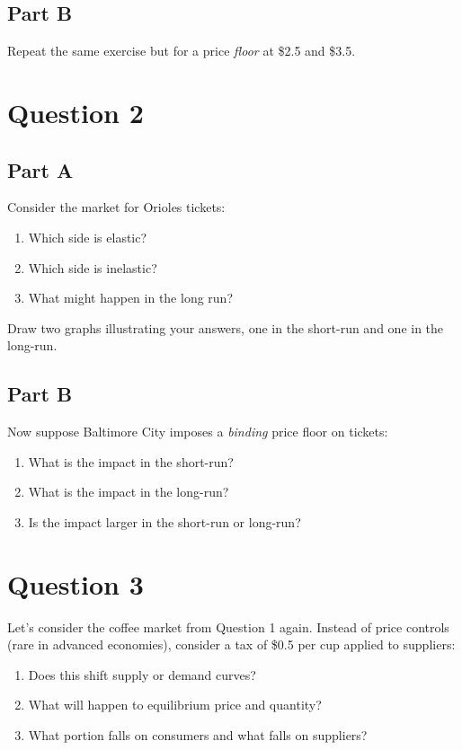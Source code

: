 \documentclass[12pt]{article}
\begin{document}
\subsection*{Part B}
Repeat the same exercise but for a price \textit{floor} at \$2.5 and \$3.5.

\section*{Question 2}

\subsection*{Part A}
Consider the market for Orioles tickets:
\begin{enumerate}
    \item Which side is elastic?
    \item Which side is inelastic?
    \item What might happen in the long run?
\end{enumerate}

Draw two graphs illustrating your answers, one in the short-run and one in the long-run.

\subsection*{Part B}
Now suppose Baltimore City imposes a \textit{binding} price floor on tickets:
    \begin{enumerate}
        \item What is the impact in the short-run?
        \item What is the impact in the long-run?
        \item Is the impact larger in the short-run or long-run?
    \end{enumerate}

\section*{Question 3}
Let's consider the coffee market from Question 1 again. Instead of price controls (rare in advanced economies), consider a tax of \$0.5 per cup applied to suppliers:

\begin{enumerate}
    \item Does this shift supply or demand curves?
    \item What will happen to equilibrium price and quantity?
    \item What portion falls on consumers and what falls on suppliers?
\end{enumerate}
\end{document}
